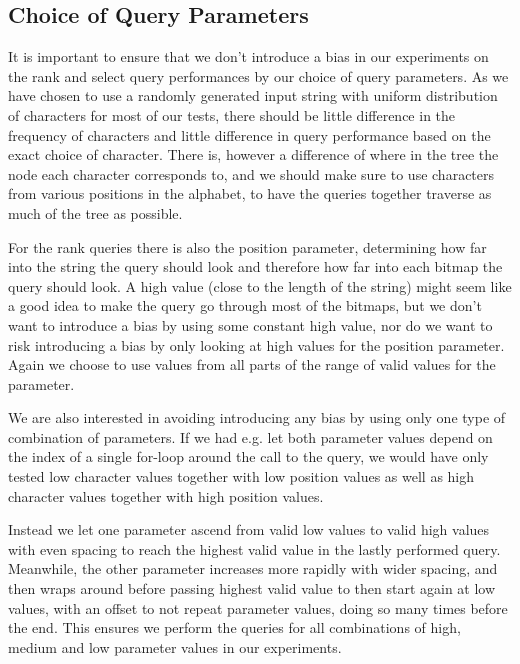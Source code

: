 \subsection{Choice of Query Parameters}
\label{sec:choiceOfQueryParameters}
It is important to ensure that we don't introduce a bias in our experiments on the rank and select query performances by our choice of query parameters.
As we have chosen to use a randomly generated input string with uniform distribution of characters for most of our tests, there should be little difference in the frequency of characters and little difference in query performance based on the exact choice of character.
There is, however a difference of where in the tree the node each character corresponds to, and we should make sure to use characters from various positions in the alphabet, to have the queries together traverse as much of the tree as possible.

For the rank queries there is also the position parameter, determining how far into the string the query should look and therefore how far into each bitmap the query should look.
A high value (close to the length of the string) might seem like a good idea to make the query go through most of the bitmaps, but we don't want to introduce a bias by using some constant high value, nor do we want to risk introducing a bias by only looking at high values for the position parameter.
Again we choose to use values from all parts of the range of valid values for the parameter.

We are also interested in avoiding introducing any bias by using only one type of combination of parameters.
If we had e.g. let both parameter values depend on the index of a single for-loop around the call to the query, we would have only tested low character values together with low position values as well as high character values together with high position values.

Instead we let one parameter ascend from valid low values to valid high values with even spacing to reach the highest valid value in the lastly performed query. Meanwhile, the other parameter increases more rapidly with wider spacing, and then wraps around before passing highest valid value to then start again at low values, with an offset to not repeat parameter values, doing so many times before the end.
This ensures we perform the queries for all combinations of high, medium and low parameter values in our experiments.
